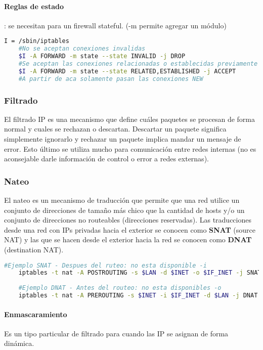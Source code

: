 \documentclass{book}
\begin{document}
	\paragraph{Reglas de estado}: se necesitan para un firewall stateful. (-m permite agregar un módulo)
	
	\begin{lstlisting}[language=sh]
	I = /sbin/iptables
	#No se aceptan conexiones invalidas
	$I -A FORWARD -m state --state INVALID -j DROP
	#Se aceptan las conexiones relacionadas o establecidas previamente
	$I -A FORWARD -m state --state RELATED,ESTABLISHED -j ACCEPT
	#A partir de aca solamente pasan las conexiones NEW
	\end{lstlisting}
	
	\subsubsection{Filtrado}
	El filtrado IP es una mecanismo que define cuáles paquetes se procesan de forma normal y cuales se rechazan o descartan. Descartar un paquete significa simplemente ignorarlo y rechazar un paquete implica mandar un mensaje de error. Esto último se utiliza mucho para comunicación entre redes internas (no es aconsejable darle información de control o error a redes externas).
	
	\subsubsection{Nateo}
	El nateo es un mecanismo de traducción que permite que una red utilice un conjunto de direcciones de tamaño más chico que la cantidad de hosts y/o un conjunto de direcciones no routeables (direcciones reservadas). Las traducciones desde una red con IPs privadas hacia el exterior se conocen como \textbf{SNAT} (source NAT) y las que se hacen desde el exterior hacia la red se conocen como \textbf{DNAT} (destination NAT).
	
	\begin{lstlisting}[language=sh]
	#Ejemplo SNAT - Despues del ruteo: no esta disponible -i
	iptables -t nat -A POSTROUTING -s $LAN -d $INET -o $IF_INET -j SNAT --to $INET
	
	#Ejemplo DNAT - Antes del routeo: no esta disponibles -o
	iptables -t nat -A PREROUTING -s $INET -i $IF_INET -d $LAN -j DNAT --to $LAN
	\end{lstlisting}	
	
	\paragraph{Enmascaramiento}
	Es un tipo particular de filtrado para cuando las IP se asignan de forma dinámica.
	
\end{document}
